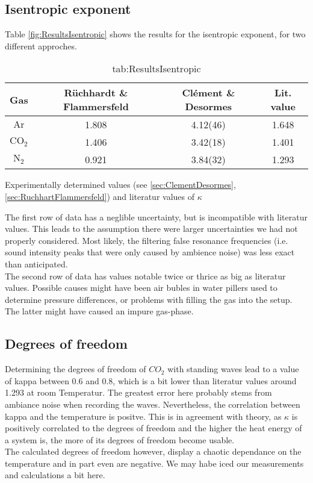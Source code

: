 \documentclass[../main.tex]{subfiles}
\begin{document}
    \subsection{Isentropic exponent}
        Table \ref{fig:ResultsIsentropic} shows the results for the isentropic exponent, for two different approches.
        \begin{table}[H]
            \centering
            \begin{tabular}{c|cc|c}
                \textbf{Gas} & \textbf{Rüchhardt \& Flammersfeld} & \textbf{Clément \& Desormes} & \textbf{Lit. value}\\
                \hline
                $\text{Ar}$ & 1.808 & 4.12(46)  & 1.648\\
                $\text{CO}_2$ & 1.406 & 3.42(18) & 1.401\\
                $\text{N}_2$ & 0.921 & 3.84(32) & 1.293\\
            \end{tabular}
            \caption{Experimentally determined values (see \ref{sec:ClementDesormes}, \ref{sec:RuchhartFlammersfeld}) and literatur values of $\kappa$}
            \caption{tab:ResultsIsentropic}
        \end{table}
        \noindent The first row of data has a neglible uncertainty, but is incompatible with literatur values. This leads to the assumption there were larger uncertainties we had not properly considered. Most likely, the filtering false resonance frequencies (i.e. sound intensity peaks that were only caused by ambience noise) was less exact than anticipated.\\

        \noindent The second row of data has values notable twice or thrice as big as literatur values. Possible causes might have been air bubles in water pillers used to determine pressure differences, or problems with filling the gas into the setup. The latter might have caused an impure gas-phase.

    \subsection{Degrees of freedom}
        Determining the degrees of freedom of $\textit{CO}_2$ with standing waves lead to a value of kappa between $\num{0.6}$ and $\num{0.8}$, which is a bit lower than literatur values around 1.293 at room Temperatur. The greatest error here probably stems from ambiance noise when recording the waves. Nevertheless, the correlation between kappa and the temperature is positve. This is in agreement with theory, as $\kappa$ is positively correlated to the degrees of freedom and the higher the heat energy of a system is, the more of its degrees of freedom become usable.\\

        \noindent The calculated degrees of freedom however,  display a chaotic dependance on the temperature and in part even are negative. We may habe iced our measurements and calculations a bit here.
\end{document}
